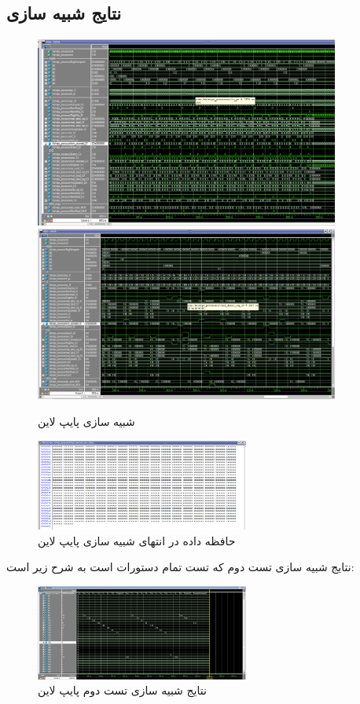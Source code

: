 \documentclass[11pt, a4paper]{article}
\begin{document}
	
	
	
	\subsection{نتایج شبیه سازی}
	
	\begin{figure}[H]
		\begin{center}
			\includegraphics[width=10cm]{Photos/7.png}
			\includegraphics[width=10cm]{Photos/8.png}
		\end{center}
		\caption{شبیه سازی پایپ لاین}
		\label{Pipeline_sim}
	\end{figure}
	
	\begin{figure}[H]
		\begin{center}
			\includegraphics[width=7cm]{Photos/9.png}
		\end{center}
		\caption{حافظه داده در انتهای شبیه سازی پایپ لاین}
		\label{Pipeline_data_mem}
	\end{figure}
	
	
نتایج شبیه سازی تست دوم که تست تمام دستورات است به شرح زیر است:
	\begin{figure}[H]
		\begin{center}
			\includegraphics[width=7cm]{Photos/10.jpg}
		\end{center}
		\caption{نتایج شبیه سازی تست دوم پایپ لاین}
		\label{mips2_pipeline_sim}
	\end{figure}
	
\end{document}
